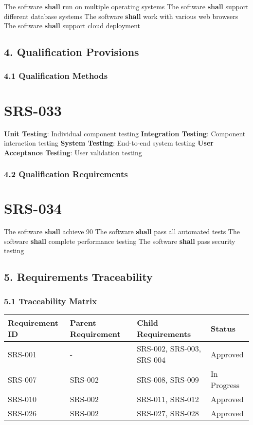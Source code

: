 The software \textbf{shall} run on multiple operating systems
The software \textbf{shall} support different database systems
The software \textbf{shall} work with various web browsers
The software \textbf{shall} support cloud deployment

\subsection{4. Qualification Provisions}

\subsubsection{4.1 Qualification Methods}

\section{SRS-033}\label{SRS-033}

\textbf{Unit Testing}: Individual component testing
\textbf{Integration Testing}: Component interaction testing
\textbf{System Testing}: End-to-end system testing
\textbf{User Acceptance Testing}: User validation testing

\subsubsection{4.2 Qualification Requirements}

\section{SRS-034}\label{SRS-034}

The software \textbf{shall} achieve 90%
The software \textbf{shall} pass all automated tests
The software \textbf{shall} complete performance testing
The software \textbf{shall} pass security testing

\subsection{5. Requirements Traceability}

\subsubsection{5.1 Traceability Matrix}

\begin{longtable}{|l|l|l|l|}
 Requirement ID & Parent Requirement & Child Requirements & Status \\
\hline
 SRS-001 & - & SRS-002, SRS-003, SRS-004 & Approved \\
 SRS-007 & SRS-002 & SRS-008, SRS-009 & In Progress \\
 SRS-010 & SRS-002 & SRS-011, SRS-012 & Approved \\
 SRS-026 & SRS-002 & SRS-027, SRS-028 & Approved \\
\end{longtable}

